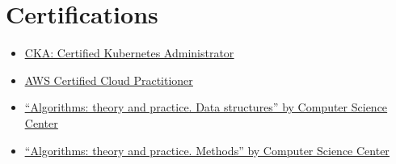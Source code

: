 \documentclass[a4paper,10pt]{article}
\newcommand{\resumeItem}[1]{
  \item\small{#1}
}
\newcommand{\resumeItemListStart}{\begin{itemize}[rightmargin=0.11in]}
\newcommand{\resumeItemListEnd}{\end{itemize}}
\newcommand{\hrefUline}[2]{
  \href{#1}{\uline{#2}}
}
\begin{document}
\section{Certifications}
  \resumeItemListStart{}
    \resumeItem{\hrefUline{https://www.credly.com/badges/24659e03-b038-41e8-9a85-9c10fbe525d5}{CKA: Certified Kubernetes Administrator}}
    \resumeItem{\hrefUline{https://www.credly.com/badges/968bad65-6464-49fb-b836-c53a0dd30daf}{AWS Certified Cloud Practitioner}}
    \resumeItem{\hrefUline{https://stepik.org/cert/151752?lang=en}{``Algorithms: theory and practice. Data structures'' by Computer Science Center}}
    \resumeItem{\hrefUline{https://stepik.org/cert/39100?lang=en}{``Algorithms: theory and practice. Methods'' by Computer Science Center}}
  \resumeItemListEnd{}
\end{document}
